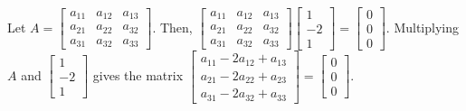 \documentclass[11pt]{scrartcl}
\theoremstyle{dotlessP}
\theoremstyle{dotlessN}
\begin{document}
Let $A = 
\begin{bmatrix}
	a_{11} & a_{12} & a_{13} \\
	a_{21} & a_{22} & a_{32} \\
	a_{31} & a_{32} & a_{33}
\end{bmatrix}$. Then, $\begin{bmatrix}
	a_{11} & a_{12} & a_{13} \\
	a_{21} & a_{22} & a_{32} \\
	a_{31} & a_{32} & a_{33}
\end{bmatrix}
\begin{bmatrix}
	1 \\
	-2 \\
	1 
\end{bmatrix} = 
\begin{bmatrix}
	0 \\
	0 \\
	0
\end{bmatrix}$. Multiplying $A$ and $
\begin{bmatrix}
	1 \\
	-2 \\
	1
\end{bmatrix}$ gives the matrix 
$\begin{bmatrix}
	a_{11} - 2a_{12} + a_{13} \\
	a_{21} - 2a_{22} + a_{23} \\
	a_{31} - 2a_{32} + a_{33}
\end{bmatrix} = 
\begin{bmatrix}
	0 \\
	0 \\
	0
\end{bmatrix}$. 
\end{document}
